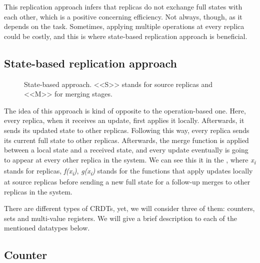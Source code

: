 This replication approach infers that replicas do not exchange full states with each other, which is a positive concerning efficiency. Not always, though, as it depends on the task. Sometimes, applying multiple operations at every replica could be costly, and this is where state-based replication approach is beneficial.


\subsection*{State-based replication approach}
\begin{figure}[!htb]
    \begin{center}
    \def\svgwidth{\linewidth}
    
    \caption {State-based approach\cite{2}. <<S>> stands for source replicas and <<M>> for merging stages.}
    \label{fig:theory2}
\end{center}
\end{figure}

The idea of this approach is kind of opposite to the operation-based one. Here, every replica, when it receives an update, first applies it locally. Afterwards, it sends its updated state to other replicas. Following this way, every replica sends its current full state to other replicas. Afterwards, the merge function is applied between a local state and a received state, and every update eventually is going to appear at every other replica in the system. We can see this it in the , where \textit{x\textsubscript{i}} stands for replicas, \textit{f(x\textsubscript{i})}, \textit{g(x\textsubscript{i})} stands for the functions that apply updates locally at source replicas before sending a new full state for a follow-up merges to other replicas in the system.


There are different types of CRDTs, yet, we will consider three of them: counters, sets and multi-value registers. We will give a brief description to each of the mentioned datatypes below.

\subsection*{Counter}

